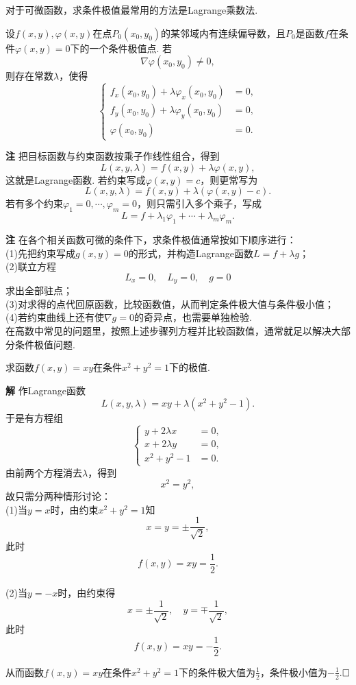 \documentclass{ctexart}
\newenvironment{custom}[1]{\par\noindent \textbf{#1}\quad}{\par\vspace{1em}}
\begin{document}
对于可微函数，求条件极值最常用的方法是Lagrange乘数法.

\begin{theorem}
设$f(x,y),\varphi(x,y)$在点$P_{0}(x_{0},y_{0})$的某邻域内有连续偏导数，且$P_{0}$是函数$f$在条件$\varphi(x,y)=0$下的一个条件极值点. 若
$$\nabla\varphi(x_{0},y_{0})\neq 0,$$
则存在常数$\lambda$，使得
$$\left\{\begin{aligned}
f_{x}(x_{0},y_{0})+\lambda\varphi_{x}(x_{0},y_{0})&=0,\\
f_{y}(x_{0},y_{0})+\lambda\varphi_{y}(x_{0},y_{0})&=0,\\
\varphi(x_{0},y_{0})&=0.
\end{aligned}\right.$$
\end{theorem}

\begin{custom}{注}
把目标函数与约束函数按乘子作线性组合，得到
$$L(x,y,\lambda)=f(x,y)+\lambda\varphi(x,y),$$
这就是Lagrange函数. 若约束写成$\varphi(x,y)=c$，则更常写为
$$L(x,y,\lambda)=f(x,y)+\lambda(\varphi(x,y)-c).$$
若有多个约束$\varphi_{1}=0,\cdots,\varphi_{m}=0$，则只需引入多个乘子，写成
$$L=f+\lambda_{1}\varphi_{1}+\cdots+\lambda_{m}\varphi_{m}.$$
\end{custom}

\begin{custom}{注}
在各个相关函数可微的条件下，求条件极值通常按如下顺序进行：\\
(1)先把约束写成$g(x,y)=0$的形式，并构造Lagrange函数$L=f+\lambda g$；\\
(2)联立方程
$$L_{x}=0,\quad L_{y}=0,\quad g=0$$
求出全部驻点；\\
(3)对求得的点代回原函数，比较函数值，从而判定条件极大值与条件极小值；\\
(4)若约束曲线上还有使$\nabla g=0$的奇异点，也需要单独检验.\\
在高数中常见的问题里，按照上述步骤列方程并比较函数值，通常就足以解决大部分条件极值问题.
\end{custom}

\begin{example}
求函数$f(x,y)=xy$在条件$x^{2}+y^{2}=1$下的极值.
\end{example}

\begin{custom}{解}
作Lagrange函数
$$L(x,y,\lambda)=xy+\lambda(x^{2}+y^{2}-1).$$
于是有方程组
$$\left\{\begin{aligned}
y+2\lambda x&=0,\\
x+2\lambda y&=0,\\
x^{2}+y^{2}-1&=0.
\end{aligned}\right.$$
由前两个方程消去$\lambda$，得到
$$x^{2}=y^{2},$$
故只需分两种情形讨论：\\
(1)当$y=x$时，由约束$x^{2}+y^{2}=1$知
$$x=y=\pm \frac{1}{\sqrt{2}},$$
此时
$$f(x,y)=xy=\frac{1}{2}.$$\\
(2)当$y=-x$时，由约束得
$$x=\pm \frac{1}{\sqrt{2}},\quad y=\mp \frac{1}{\sqrt{2}},$$
此时
$$f(x,y)=xy=-\frac{1}{2}.$$

从而函数$f(x,y)=xy$在条件$x^{2}+y^{2}=1$下的条件极大值为$\frac{1}{2}$，条件极小值为$-\frac{1}{2}$.$\hfill{\square}$
\end{custom}
\end{document}
